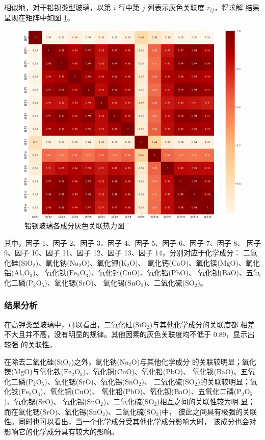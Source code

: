 \documentclass[withoutpreface,bwprint]{cumcmthesis} %
\begin{document}
相似地，对于铅钡类型玻璃，以第 $i$ 行中第 $j$ 列表示灰色关联度 $r_{ij}$，将求解
结果呈现在矩阵中如图 \ref{fig:PbBagrey}。
\begin{figure}[!htb]
    \centering
    \includegraphics[scale=0.25]{铅钡玻璃各成分灰色关联热力图.pdf}
    \caption{铅钡玻璃各成分灰色关联热力图}
    \label{fig:PbBagrey}
\end{figure}

其中，因子 1、因子 2、因子 3、因子 4、因子 5、因子 6、因子 7、因子 8、
因子 9、因子 10、因子 11、因子 12、因子 13、因子 14，分别对应于化学成分：
二氧化硅($\mathrm{SiO_2}$)、氧化钠($\mathrm{Na_2O}$)、氧化钾($\mathrm{K_2O}$)、
氧化钙($\mathrm{CaO}$)、氧化镁($\mathrm{MgO}$)、氧化铝($\mathrm{Al_2O_3}$)、
氧化铁($\mathrm{Fe_2O_3}$)、氧化铜($\mathrm{CuO}$)、氧化铅(PbO)、
氧化钡(BaO)、五氧化二磷($\mathrm{P_2O_5}$)、氧化锶(SrO)、
氧化锡($\mathrm{SnO_2}$)、二氧化硫($\mathrm{SO_2}$)。

\subsubsection{结果分析}
在高钾类型玻璃中，可以看出，二氧化硅($\mathrm{SiO_2}$)与其他化学成分的关联度都
相差不大且并不高，没有明显的规律。其他因素的灰色关联度均不低于 0.89，显示出较强
的关联性。

在除去二氧化硅($\mathrm{SiO_2}$)之外，氧化钠($\mathrm{Na_2O}$)与其他化学成分
的关联较明显；氧化镁(MgO)与氧化铁($\mathrm{Fe_2O_3}$)、氧化铜(CuO)、氧化铅(PbO)、
氧化钡(BaO)、五氧化二磷($\mathrm{P_2O_5}$)、氧化锶(SrO)、氧化锡($\mathrm{SnO_2}$)、
二氧化硫($\mathrm{SO_2}$)的关联较明显；氧化铁($\mathrm{Fe_2O_3}$)、氧化铜(CuO)、
氧化铅(PbO)、氧化钡(BaO)、五氧化二磷($\mathrm{P_2O_5}$)、氧化锶(SrO)、
氧化锡($\mathrm{SnO_2}$)、二氧化硫($\mathrm{SO_2}$)相互之间的关联性较为明
显；而在氧化锶(SrO)、氧化锡($\mathrm{SnO_2}$)、二氧化硫($\mathrm{SO_2}$)中，
彼此之间具有极强的关联性。同时也可以看出，当一个化学成分受其他化学成分影响大时，
该成分也会对影响它的化学成分具有较大的影响。
\end{document}
